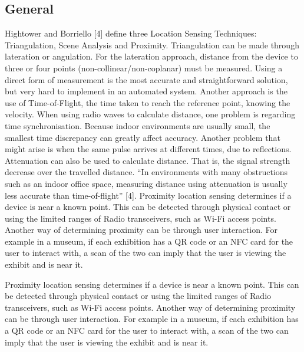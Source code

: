 \subsection{General}
Hightower and Borriello [4] define three Location Sensing Techniques: Triangulation, Scene Analysis and Proximity. 
Triangulation can be made through lateration or angulation. For the lateration approach, distance from the device to three or four points (non-collinear/non-coplanar) must be measured. Using a direct form of measurement is the most accurate and straightforward solution, but very hard to implement in an automated system. Another approach is the use of Time-of-Flight, the time taken to reach the reference point, knowing the velocity. When using radio waves to calculate distance, one problem is regarding time synchronisation. Because indoor environments are usually small, the smallest time discrepancy can greatly affect accuracy. Another problem that might arise is when the same pulse arrives at different times, due to reflections. Attenuation can also be used to calculate distance. That is, the signal strength decrease over the travelled distance. “In environments with many obstructions such as an indoor office space, measuring distance using attenuation is usually less accurate than time-of-flight” [4].
Proximity location sensing determines if a device is near a known point. This can be detected through physical contact or using the limited ranges of Radio transceivers, such as Wi-Fi access points. Another way of determining proximity can be through user interaction. For example in a museum, if each exhibition has a QR code or an NFC card for the user to interact with, a scan of the two can imply that the user is viewing the exhibit and is near it.

Proximity location sensing determines if a device is near a known point. This can be detected through physical contact or using the limited ranges of Radio transceivers, such as Wi-Fi access points. Another way of determining proximity can be through user interaction. For example in a museum, if each exhibition has a QR code or an NFC card for the user to interact with, a scan of the two can imply that the user is viewing the exhibit and is near it.
